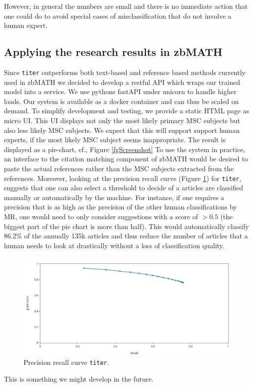 However, in general the numbers
are small and there is no immediate action that one could do to avoid special cases of misclassification that do not involve a human expert.

\subsection{Applying the research results in zbMATH}
Since \texttt{titer} outperforms both text-based and reference based methods currently used in zbMATH we decided to develop a restful API which wraps our trained model into a service.
We use pythons fastAPI under unicorn to handle higher loads.
Our system is available as a docker container and can thus be scaled on demand.
To simplify development and testing, we provide a static HTML page as micro UI.
This UI displays not only the most likely primary MSC subjects but also less likely MSC subjects.
We expect that this will support support human experts,
if the most likely MSC subject seems inappropriate.
The result is displayed as a pie-chart, cf., Figure \ref{fgScreenshot}
To use the system in practice, an interface to the citation matching component of zbMATH would be desired to paste the actual references rather than the MSC subjects extracted from the references.
Moreover, looking at the precision recall curve (Figure \ref{fgPR}) for \texttt{titer}, suggests that one can also select a threshold to decide of a articles
are classified manually or automatically by the machine.
For instance, if one requires a precision that is as high as the precision of the other human classifications by MR, one would need to only consider suggestions with a score of $>0.5$ (the biggest
part of the pie chart is more than half). This would automatically classify $86.2\%$ of the annually 135k articles and thus reduce the number of articles that a human needs to look at drastically without a loss of classification quality.

\begin{figure}[h]
  \centering
  \includegraphics[width=.7\textwidth]{prcurve.png}
  \caption{Precision recall curve \texttt{titer}.}
  \label{fgPR}
\end{figure}
This is something we might develop in the future.


